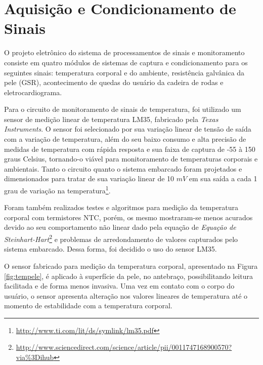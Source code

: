 \section{Aquisição e Condicionamento de Sinais}

O projeto eletrônico do sistema de processamentos de sinais e monitoramento
consiste em quatro módulos de sistemas de captura e condicionamento para os
seguintes sinais: temperatura corporal e do ambiente, resistência galvânica da pele
(GSR), acontecimento de quedas do usuário da cadeira de rodas e eletrocardiograma.

Para o circuito de monitoramento de sinais de temperatura, foi utilizado um sensor
de medição linear de temperatura LM35, fabricado pela \textit{Texas Instruments}.
O sensor foi selecionado por sua variação linear de tensão de saída com a
variação de temperatura, além do seu baixo consumo e alta precisão de medidas
de temperatura com rápida resposta e sua faixa de captura de -55 à 150 graus Celsius,
tornando-o viável para monitoramento de temperaturas corporais e ambientais.
Tanto o circuito quanto o sistema embarcado foram projetados e dimensionados
para tratar de sua variação linear de 10 $mV$ em sua saída a cada 1 grau de variação
na temperatura\footnote{\url{http://www.ti.com/lit/ds/symlink/lm35.pdf}}.

Foram também realizados testes e algoritmos para medição da temperatura corporal com
termistores NTC, porém, os mesmo mostraram-se menos acurados devido ao seu comportamento
não linear dado pela equação de \textit{Equação de
Steinhart-Hart}\footnote{\url{http://www.sciencedirect.com/science/article/pii/0011747168900570?via\%3Dihub}}
e problemas de arredondamento de valores capturados pelo sistema embarcado.
Dessa forma, foi decidido o uso do sensor LM35.

O sensor fabricado para medição da temperatura corporal, apresentado na Figura
\ref{fig:tempele}, é aplicado à superfície da pele, no antebraço, possibilitando
leitura facilitada e de forma menos invasiva. Uma vez em contato com o corpo do
usuário, o sensor apresenta alteração nos valores lineares de temperatura até o
momento de estabilidade com a temperatura corporal.

